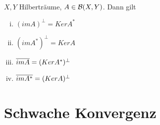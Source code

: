 \documentclass[ngerman]{report}
\begin{document}
	\begin{thm}
		$X,Y$ Hilberträume, $A\in \BS$. Dann gilt
			\begin{enumerate}[(i)]
				\item $(imA)^\perp = Ker A^*$
				\item $(imA^*)^\perp = Ker A$
				\item $\overline{imA} = (KerA^*)^\perp$
				\item $\overline{imA^*} = (KerA)^\perp$
			\end{enumerate}
	\end{thm}

	\section{Schwache Konvergenz}
\end{document}
